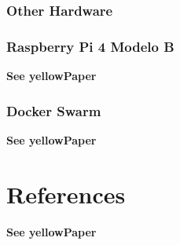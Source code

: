\documentclass[12pt]{report}
\begin{document}
  \subsection{Other Hardware} \label{ch:other-hardware}
  \subsection{Raspberry Pi 4 Modelo B} \label{ch:raspberry4}
  \textbf{See yellowPaper}

  \subsection{Docker Swarm} \label{ch:docker-swarm}
  \textbf{See yellowPaper}

  \chapter*{References}
  \textbf{See yellowPaper}
\end{document}
